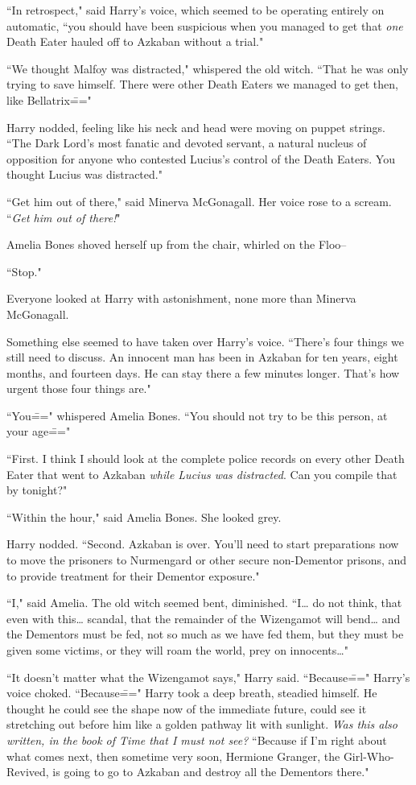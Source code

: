 ``In retrospect," said Harry's voice, which seemed to be operating entirely on automatic, ``you should have been suspicious when you managed to get that \emph{one} Death Eater hauled off to Azkaban without a trial."

``We thought Malfoy was distracted," whispered the old witch. ``That he was only trying to save himself. There were other Death Eaters we managed to get then, like Bellatrix\==="

Harry nodded, feeling like his neck and head were moving on puppet strings. ``The Dark Lord's most fanatic and devoted servant, a natural nucleus of opposition for anyone who contested Lucius's control of the Death Eaters. You thought Lucius was distracted."

``Get him out of there," said Minerva McGonagall. Her voice rose to a scream. ``\emph{Get him out of there!}"

Amelia Bones shoved herself up from the chair, whirled on the Floo\---

``Stop."

Everyone looked at Harry with astonishment, none more than Minerva McGonagall.

Something else seemed to have taken over Harry's voice. ``There's four things we still need to discuss. An innocent man has been in Azkaban for ten years, eight months, and fourteen days. He can stay there a few minutes longer. That's how urgent those four things are."

``You\===" whispered Amelia Bones. ``You should not try to be this person, at your age\==="

``First. I think I should look at the complete police records on every other Death Eater that went to Azkaban \emph{while Lucius was distracted}. Can you compile that by tonight?"

``Within the hour," said Amelia Bones. She looked grey.

Harry nodded. ``Second. Azkaban is over. You'll need to start preparations now to move the prisoners to Nurmengard or other secure non-Dementor prisons, and to provide treatment for their Dementor exposure."

``I," said Amelia. The old witch seemed bent, diminished. ``I{\ldots} do not think, that even with this{\ldots} scandal, that the remainder of the Wizengamot will bend{\ldots} and the Dementors must be fed, not so much as we have fed them, but they must be given some victims, or they will roam the world, prey on innocents{\ldots}"

``It doesn't matter what the Wizengamot says," Harry said. ``Because\===" Harry's voice choked. ``Because\===" Harry took a deep breath, steadied himself. He thought he could see the shape now of the immediate future, could see it stretching out before him like a golden pathway lit with sunlight. \emph{Was this also written, in the book of Time that I must not see?} ``Because if I'm right about what comes next, then sometime very soon, Hermione Granger, the Girl-Who-Revived, is going to go to Azkaban and destroy all the Dementors there."

